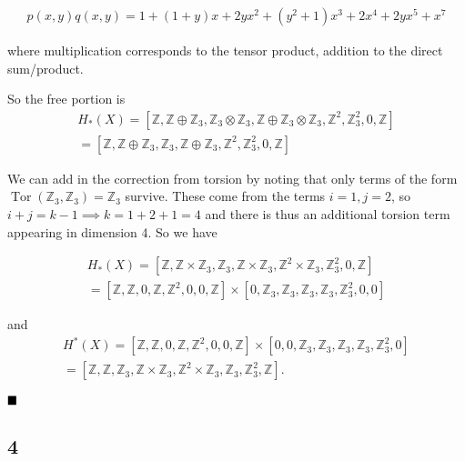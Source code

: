 \begin{align*}p(x,y)q(x,y) = 1 + (1+y)x + 2yx^2 + (y^2+1)x^3 + 2x^4 + 2yx^5 + x^7\end{align*}

where multiplication corresponds to the tensor product, addition to the
direct sum/product.

So the free portion is
\begin{align*}H_*(X) = [{\mathbb{Z}}, {\mathbb{Z}}\oplus {\mathbb{Z}}_3, {\mathbb{Z}}_3\otimes{\mathbb{Z}}_3, {\mathbb{Z}}\oplus {\mathbb{Z}}_3\otimes{\mathbb{Z}}_3, {\mathbb{Z}}^2, {\mathbb{Z}}_3^2, 0, {\mathbb{Z}}] \\
=[{\mathbb{Z}}, {\mathbb{Z}}\oplus {\mathbb{Z}}_3, {\mathbb{Z}}_3, {\mathbb{Z}}\oplus {\mathbb{Z}}_3, {\mathbb{Z}}^2, {\mathbb{Z}}_3^2, 0, {\mathbb{Z}}]
\end{align*}

We can add in the correction from torsion by noting that only terms of
the form
\(\operatorname{Tor}({\mathbb{Z}}_3, {\mathbb{Z}}_3) = {\mathbb{Z}}_3\)
survive. These come from the terms \(i=1, j=2\), so
\(i+j=k-1 \implies k = 1+2+1 = 4\) and there is thus an additional
torsion term appearing in dimension 4. So we have

\begin{align*}H_*(X) = [{\mathbb{Z}}, {\mathbb{Z}}\times {\mathbb{Z}}_3, {\mathbb{Z}}_3, {\mathbb{Z}}\times {\mathbb{Z}}_3, {\mathbb{Z}}^2 \times {\mathbb{Z}}_3, {\mathbb{Z}}_3^2, 0, {\mathbb{Z}}] \\ = [{\mathbb{Z}}, {\mathbb{Z}}, 0,{\mathbb{Z}},{\mathbb{Z}}^2,0,0,{\mathbb{Z}}] \times [0,{\mathbb{Z}}_3,{\mathbb{Z}}_3,{\mathbb{Z}}_3,{\mathbb{Z}}_3,{\mathbb{Z}}_3^2,0,0]\end{align*}

and
\begin{align*}H^*(X)= [{\mathbb{Z}}, {\mathbb{Z}}, 0,{\mathbb{Z}},{\mathbb{Z}}^2,0,0,{\mathbb{Z}}] \times [0, 0,{\mathbb{Z}}_3,{\mathbb{Z}}_3,{\mathbb{Z}}_3,{\mathbb{Z}}_3,{\mathbb{Z}}_3^2,0] \\ = [{\mathbb{Z}}, {\mathbb{Z}}, {\mathbb{Z}}_3,{\mathbb{Z}}\times {\mathbb{Z}}_3,{\mathbb{Z}}^2\times {\mathbb{Z}}_3,{\mathbb{Z}}_3,{\mathbb{Z}}_3^2,{\mathbb{Z}}].\end{align*}

\(\hfill\blacksquare\)

\hypertarget{section-3}{%
\subsection{4}\label{section-3}}

